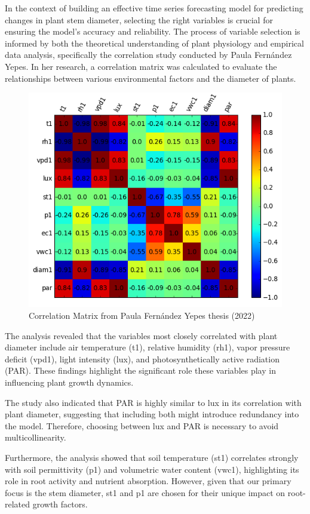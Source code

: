 In the context of building an effective time series forecasting model for predicting changes in plant stem diameter, selecting the right variables is crucial for ensuring the model's accuracy and reliability. The process of variable selection is informed by both the theoretical understanding of plant physiology and empirical data analysis, specifically the correlation study conducted by Paula Fernández Yepes. In her research, a correlation matrix was calculated to evaluate the relationships between various environmental factors and the diameter of plants.

\begin{figure}[htbp]
    \centering
    \includegraphics[width=10 cm]{4_ChapterMaterials/figuras/Correlation_matrix.png}
    \caption{Correlation Matrix from Paula Fernández Yepes thesis (2022)~\cite{FernandezYepes2022}}
    \end{figure}

The analysis revealed that the variables most closely correlated with plant diameter include air temperature (t1), relative humidity (rh1), vapor pressure deficit (vpd1), light intensity (lux), and photosynthetically active radiation (PAR). These findings highlight the significant role these variables play in influencing plant growth dynamics.

The study also indicated that PAR is highly similar to lux in its correlation with plant diameter, suggesting that including both might introduce redundancy into the model. Therefore, choosing between lux and PAR is necessary to avoid multicollinearity.

Furthermore, the analysis showed that soil temperature (st1) correlates strongly with soil permittivity (p1) and volumetric water content (vwc1), highlighting its role in root activity and nutrient absorption. However, given that our primary focus is the stem diameter, st1 and p1 are chosen for their unique impact on root-related growth factors. 

